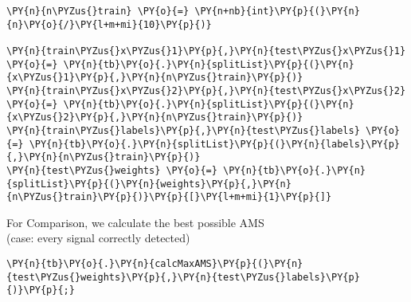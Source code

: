 
{\par%
\vspace{-1\baselineskip}%
}%
\begin{notebookcell}[]%
\begin{addmargin}[\cellleftmargin]{0em}%
{\smaller%
\par%
%
\vspace{-1\smallerfontscale}%
\begin{Verbatim}[commandchars=\\\{\}]
\PY{n}{n\PYZus{}train} \PY{o}{=} \PY{n+nb}{int}\PY{p}{(}\PY{n}{n}\PY{o}{/}\PY{l+m+mi}{10}\PY{p}{)}

\PY{n}{train\PYZus{}x\PYZus{}1}\PY{p}{,}\PY{n}{test\PYZus{}x\PYZus{}1} \PY{o}{=} \PY{n}{tb}\PY{o}{.}\PY{n}{splitList}\PY{p}{(}\PY{n}{x\PYZus{}1}\PY{p}{,}\PY{n}{n\PYZus{}train}\PY{p}{)}
\PY{n}{train\PYZus{}x\PYZus{}2}\PY{p}{,}\PY{n}{test\PYZus{}x\PYZus{}2} \PY{o}{=} \PY{n}{tb}\PY{o}{.}\PY{n}{splitList}\PY{p}{(}\PY{n}{x\PYZus{}2}\PY{p}{,}\PY{n}{n\PYZus{}train}\PY{p}{)}
\PY{n}{train\PYZus{}labels}\PY{p}{,}\PY{n}{test\PYZus{}labels} \PY{o}{=} \PY{n}{tb}\PY{o}{.}\PY{n}{splitList}\PY{p}{(}\PY{n}{labels}\PY{p}{,}\PY{n}{n\PYZus{}train}\PY{p}{)}
\PY{n}{test\PYZus{}weights} \PY{o}{=} \PY{n}{tb}\PY{o}{.}\PY{n}{splitList}\PY{p}{(}\PY{n}{weights}\PY{p}{,}\PY{n}{n\PYZus{}train}\PY{p}{)}\PY{p}{[}\PY{l+m+mi}{1}\PY{p}{]}
\end{Verbatim}
%
\par%
\vspace{-1\smallerfontscale}}%
\end{addmargin}
\end{notebookcell}


    For Comparison, we calculate the best possible AMS\\
(case: every signal correctly detected)


{\par%
\vspace{-1\baselineskip}%
}%
\begin{notebookcell}[]%
\begin{addmargin}[\cellleftmargin]{0em}%
{\smaller%
\par%
%
\vspace{-1\smallerfontscale}%
\begin{Verbatim}[commandchars=\\\{\}]
\PY{n}{tb}\PY{o}{.}\PY{n}{calcMaxAMS}\PY{p}{(}\PY{n}{test\PYZus{}weights}\PY{p}{,}\PY{n}{test\PYZus{}labels}\PY{p}{)}\PY{p}{;}
\end{Verbatim}
%
\par%
\vspace{-1\smallerfontscale}}%
\end{addmargin}
\end{notebookcell}

